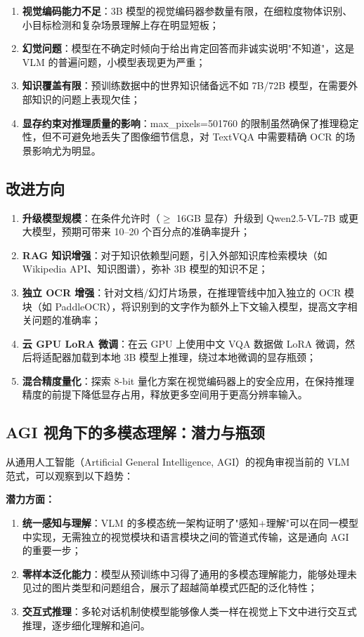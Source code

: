 \documentclass{SYSUReport}
\begin{document}
\begin{enumerate}[label=(\arabic*)]
    \item \textbf{视觉编码能力不足}：3B 模型的视觉编码器参数量有限，在细粒度物体识别、小目标检测和复杂场景理解上存在明显短板；
    \item \textbf{幻觉问题}：模型在不确定时倾向于给出肯定回答而非诚实说明"不知道"，这是 VLM 的普遍问题，小模型表现更为严重；
    \item \textbf{知识覆盖有限}：预训练数据中的世界知识储备远不如 7B/72B 模型，在需要外部知识的问题上表现欠佳；
    \item \textbf{显存约束对推理质量的影响}：max\_pixels=501760 的限制虽然确保了推理稳定性，但不可避免地丢失了图像细节信息，对 TextVQA 中需要精确 OCR 的场景影响尤为明显。
\end{enumerate}

\subsection{改进方向}

\begin{enumerate}[label=(\arabic*)]
    \item \textbf{升级模型规模}：在条件允许时（$\geq$ 16GB 显存）升级到 Qwen2.5-VL-7B 或更大模型，预期可带来 10--20 个百分点的准确率提升；
    \item \textbf{RAG 知识增强}：对于知识依赖型问题，引入外部知识库检索模块（如 Wikipedia API、知识图谱），弥补 3B 模型的知识不足；
    \item \textbf{独立 OCR 增强}：针对文档/幻灯片场景，在推理管线中加入独立的 OCR 模块（如 PaddleOCR），将识别到的文字作为额外上下文输入模型，提高文字相关问题的准确率；
    \item \textbf{云 GPU LoRA 微调}：在云 GPU 上使用中文 VQA 数据做 LoRA 微调，然后将适配器加载到本地 3B 模型上推理，绕过本地微调的显存瓶颈；
    \item \textbf{混合精度量化}：探索 8-bit 量化方案在视觉编码器上的安全应用，在保持推理精度的前提下降低显存占用，释放更多空间用于更高分辨率输入。
\end{enumerate}

\subsection{AGI 视角下的多模态理解：潜力与瓶颈}

从通用人工智能（Artificial General Intelligence, AGI）的视角审视当前的 VLM 范式，可以观察到以下趋势：

\textbf{潜力方面：}
\begin{enumerate}[label=(\arabic*)]
    \item \textbf{统一感知与理解}：VLM 的多模态统一架构证明了"感知+理解"可以在同一模型中实现，无需独立的视觉模块和语言模块之间的管道式传输，这是通向 AGI 的重要一步；
    \item \textbf{零样本泛化能力}：模型从预训练中习得了通用的多模态理解能力，能够处理未见过的图片类型和问题组合，展示了超越简单模式匹配的泛化特性；
    \item \textbf{交互式推理}：多轮对话机制使模型能够像人类一样在视觉上下文中进行交互式推理，逐步细化理解和追问。
\end{enumerate}
\end{document}
